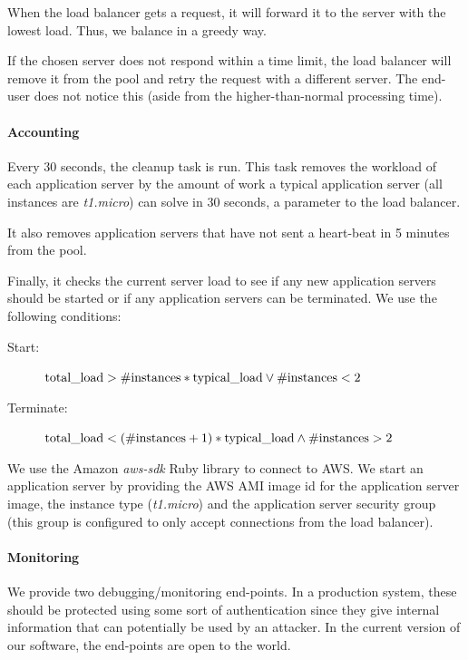			When the load balancer gets a request, it will forward it to the server with the lowest load.
			Thus, we balance in a greedy way.
			
			If the chosen server does not respond within a time limit, the load balancer will remove it from the pool and retry the request with a different server.
			The end-user does not notice this (aside from the higher-than-normal processing time).
		
		\paragraph{Accounting}
			Every 30 seconds, the cleanup task is run.
			This task removes the workload of each application server by the amount of work a typical application server (all instances are \textit{t1.micro}) can solve in 30 seconds, a parameter to the load balancer.
			
			It also removes application servers that have not sent a heart-beat in 5 minutes from the pool.
			
			Finally, it checks the current server load to see if any new application servers should be started or if any application servers can be terminated.
			We use the following conditions:
			
			\begin{description}
				\item[Start:] $\textnormal{total\_load} > \#\textnormal{instances} * \textnormal{typical\_load} \lor \#\textnormal{instances} < 2$
				\item[Terminate:] $\textnormal{total\_load} < (\#\textnormal{instances} + 1) * \textnormal{typical\_load} \land \#\textnormal{instances} > 2$
			\end{description}
			
			We use the Amazon \textit{aws-sdk} Ruby library to connect to AWS.
			We start an application server by providing the AWS AMI image id for the application server image,
			the instance type (\textit{t1.micro}) and the application server security group (this group is configured to only accept connections from the load balancer).
		
		\paragraph{Monitoring}
			We provide two debugging/monitoring end-points.
			In a production system, these should be protected using some sort of authentication since they give internal information that can potentially be used by an attacker.
			In the current version of our software, the end-points are open to the world.
			
